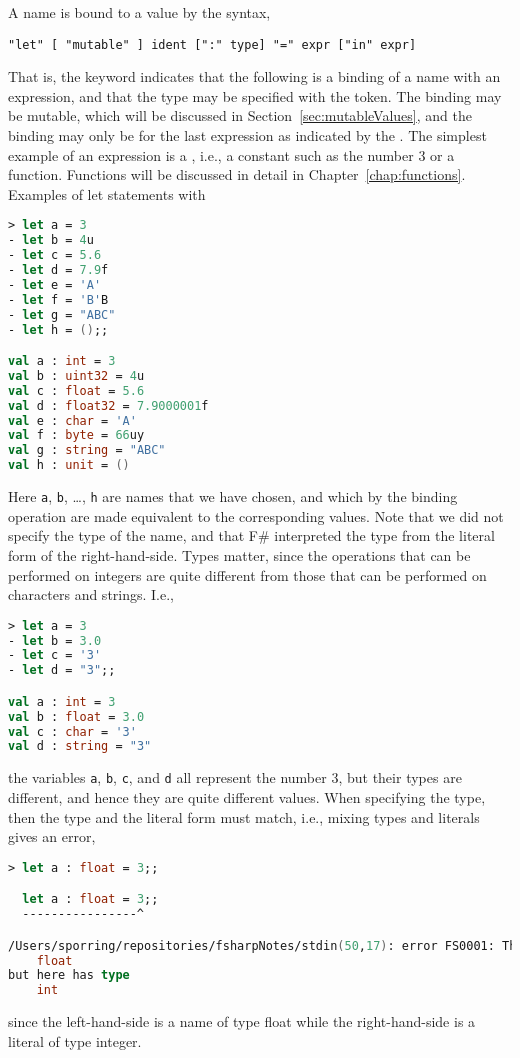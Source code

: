A name is bound to a value by the syntax,
\begin{lstlisting}[language=EBNF]
"let" [ "mutable" ] ident [":" type] "=" expr ["in" expr]
\end{lstlisting}
\begin{comment}
or alternatively
\begin{lstlisting}[language=EBNF]
"let" ["mutable"] ident [":" type] "=" expr [["in"] LF indent exp]
\end{lstlisting}
\end{comment}
That is, the  keyword indicates that the following is a binding of a name with an expression, and that the type may be specified with the \idx{\token{:}} token. The binding may be mutable, which will be discussed in Section~\ref{sec:mutableValues}, and the binding may only be for the last expression as indicated by the . The simplest example of an expression is a , i.e., a constant such as the number 3 or a function. Functions will be discussed in detail in Chapter~\ref{chap:functions}. Examples of let statements with 
\begin{lstlisting}[language=fsharp,caption={fsharpi}]
> let a = 3 
- let b = 4u 
- let c = 5.6 
- let d = 7.9f 
- let e = 'A'
- let f = 'B'B 
- let g = "ABC" 
- let h = ();;

val a : int = 3
val b : uint32 = 4u
val c : float = 5.6
val d : float32 = 7.9000001f
val e : char = 'A'
val f : byte = 66uy
val g : string = "ABC"
val h : unit = ()
\end{lstlisting}
Here \lstinline|a|, \lstinline|b|, \dots, \lstinline|h| are names that we have chosen, and which by the binding operation are made equivalent to the corresponding values. Note that we did not specify the type of the name, and that F\# interpreted the type from the literal form of the right-hand-side. Types matter, since the operations that can be performed on integers are quite different from those that can be performed on characters and strings. I.e.,
\begin{lstlisting}[language=fsharp,caption={fsharpi}]
> let a = 3
- let b = 3.0 
- let c = '3' 
- let d = "3";;

val a : int = 3
val b : float = 3.0
val c : char = '3'
val d : string = "3"
\end{lstlisting}
the variables \lstinline|a|, \lstinline|b|, \lstinline|c|, and \lstinline|d| all represent the number 3, but their types are different, and hence they are quite different values. When specifying the type, then the type and the literal form must match, i.e., mixing types and literals gives an error,
\begin{lstlisting}[language=fsharp,caption={fsharpi}]
  > let a : float = 3;;

  let a : float = 3;;
  ----------------^

/Users/sporring/repositories/fsharpNotes/stdin(50,17): error FS0001: This expression was expected to have type
    float    
but here has type
    int    
\end{lstlisting}
since the left-hand-side is a name of type float while the right-hand-side is a literal of type integer.

